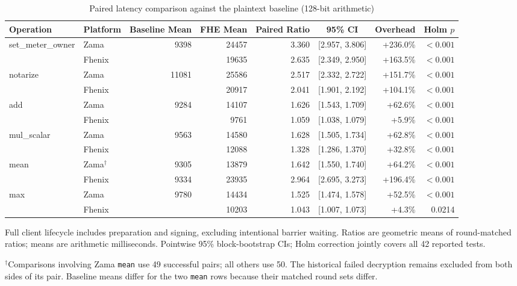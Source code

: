 \begin{table}[!t]
\caption{Paired latency comparison against the plaintext baseline (128-bit arithmetic)}
\label{tab:paired-lifecycle-comparison-128}
\centering
\footnotesize
\setlength{\tabcolsep}{5pt}
\begin{tabular}{|l|l|r|r|r|c|r|r|}
\hline
\textbf{Operation} & \textbf{Platform} & \textbf{Baseline Mean} & \textbf{FHE Mean} & \textbf{Paired Ratio} & \textbf{95\% CI} & \textbf{Overhead} & \textbf{Holm \(p\)} \\
\hline
\multirow{2}{*}{set\_meter\_owner}
& Zama & \multirow{2}{*}{9398} & 24457 & 3.360 & [2.957, 3.806] & +236.0\% & $<0.001$ \\
& Fhenix &  & 19635 & 2.635 & [2.349, 2.950] & +163.5\% & $<0.001$ \\
\hline
\multirow{2}{*}{notarize}
& Zama & \multirow{2}{*}{11081} & 25586 & 2.517 & [2.332, 2.722] & +151.7\% & $<0.001$ \\
& Fhenix &  & 20917 & 2.041 & [1.901, 2.192] & +104.1\% & $<0.001$ \\
\hline
\multirow{2}{*}{add}
& Zama & \multirow{2}{*}{9284} & 14107 & 1.626 & [1.543, 1.709] & +62.6\% & $<0.001$ \\
& Fhenix &  & 9761 & 1.059 & [1.038, 1.079] & +5.9\% & $<0.001$ \\
\hline
\multirow{2}{*}{mul\_scalar}
& Zama & \multirow{2}{*}{9563} & 14580 & 1.628 & [1.505, 1.734] & +62.8\% & $<0.001$ \\
& Fhenix &  & 12088 & 1.328 & [1.286, 1.370] & +32.8\% & $<0.001$ \\
\hline
\multirow{2}{*}{mean}
& Zama\(^{\dagger}\) & 9305 & 13879 & 1.642 & [1.550, 1.740] & +64.2\% & $<0.001$ \\
& Fhenix & 9334 & 23935 & 2.964 & [2.695, 3.273] & +196.4\% & $<0.001$ \\
\hline
\multirow{2}{*}{max}
& Zama & \multirow{2}{*}{9780} & 14434 & 1.525 & [1.474, 1.578] & +52.5\% & $<0.001$ \\
& Fhenix &  & 10203 & 1.043 & [1.007, 1.073] & +4.3\% & 0.0214 \\
\hline
\hline
\end{tabular}
\vspace{2pt}
\parbox{\textwidth}{\scriptsize Full client lifecycle includes preparation and signing, excluding intentional barrier waiting. Ratios are geometric means of round-matched ratios; means are arithmetic milliseconds. Pointwise 95\% block-bootstrap CIs; Holm correction jointly covers all 42 reported tests.}
\parbox{\textwidth}{\scriptsize \(^{\dagger}\)Comparisons involving Zama \texttt{mean} use 49 successful pairs; all others use 50. The historical failed decryption remains excluded from both sides of its pair. Baseline means differ for the two \texttt{mean} rows because their matched round sets differ.}
\end{table}
